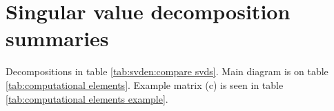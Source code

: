 \chapter{Singular value decomposition summaries}

Decompositions in table \eqref{tab:svden:compare svds}.
Main diagram is on table \eqref{tab:computational elements}.
Example matrix (c) is seen in table \eqref{tab:computational elements example}.





\endinput